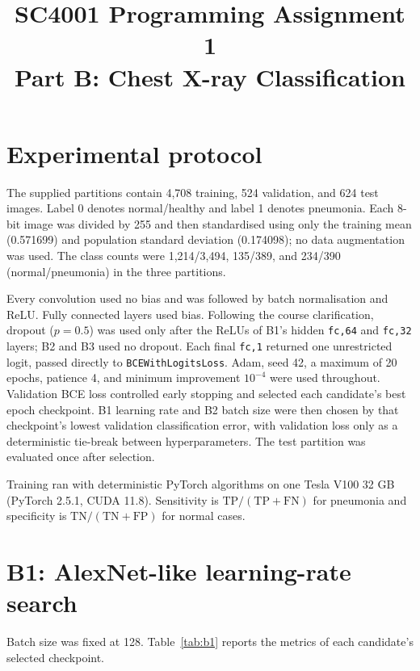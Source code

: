\documentclass[10pt,a4paper]{article}
\title{SC4001 Programming Assignment 1\\Part B: Chest X-ray Classification}
\author{\StudentName}
\date{}
\begin{document}
\maketitle
\vspace{-1.6em}

\section{Experimental protocol}
The supplied partitions contain 4,708 training, 524 validation, and 624 test
images. Label 0 denotes normal/healthy and label 1 denotes pneumonia. Each
8-bit image was divided by 255 and then standardised using only the training
mean (0.571699) and population standard deviation (0.174098); no data
augmentation was used. The class counts were 1,214/3,494, 135/389, and 234/390
(normal/pneumonia) in the three partitions.

Every convolution used no bias and was followed by batch normalisation and
ReLU. Fully connected layers used bias. Following the course clarification,
dropout ($p=0.5$) was used only after the ReLUs of B1's hidden \texttt{fc,64}
and \texttt{fc,32} layers; B2 and B3 used no dropout. Each final \texttt{fc,1}
returned one unrestricted logit, passed directly to
\texttt{BCEWithLogitsLoss}. Adam, seed 42, a maximum of 20 epochs, patience 4,
and minimum improvement $10^{-4}$ were used throughout. Validation BCE loss
controlled early stopping and selected each candidate's best epoch checkpoint.
B1 learning rate and B2 batch size were then chosen by that checkpoint's lowest
validation classification error, with validation loss only as a deterministic
tie-break between hyperparameters. The test partition was evaluated once after
selection.

Training ran with deterministic PyTorch algorithms on one Tesla V100 32 GB
(PyTorch 2.5.1, CUDA 11.8). Sensitivity is
$\mathrm{TP}/(\mathrm{TP}+\mathrm{FN})$ for pneumonia and specificity is
$\mathrm{TN}/(\mathrm{TN}+\mathrm{FP})$ for normal cases.

\section{B1: AlexNet-like learning-rate search}
Batch size was fixed at 128. Table~\ref{tab:b1} reports the metrics of each
candidate's selected checkpoint.
\end{document}
